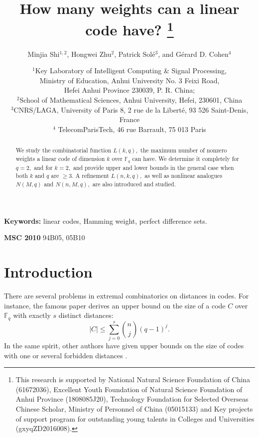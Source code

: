 \documentclass[12pt]{article}
\newcommand{\F}{\mathbb{F}}
\theoremstyle{definition}
\begin{document}
\title{\bf How many weights can a linear code have?
\thanks{This research is supported by National Natural Science Foundation of China (61672036), Excellent Youth Foundation of Natural Science Foundation of Anhui Province (1808085J20),
Technology Foundation for Selected Overseas Chinese Scholar, Ministry of Personnel of China (05015133) and
Key projects of support program for outstanding young talents in Colleges and Universities (gxyqZD2016008).}}

\author{
\small{Minjia Shi$^{1,2}$, Hongwei Zhu$^2$, Patrick Sol\'e$^3$, and G\'erard D. Cohen$^4$}\\ %
\and \small{${}^1$Key Laboratory of Intelligent Computing \& Signal Processing,}\\
 \small{Ministry of Education, Anhui University No. 3 Feixi Road,}\\
  \small{Hefei Anhui Province 230039, P. R. China;}\\
\small{${}^2$School of Mathematical Sciences, Anhui University, Hefei, 230601, China}\\
[-0.8ex]
\small{${}^3$CNRS/LAGA, University of Paris 8, 2 rue de la Libert\'e, 93 526 Saint-Denis, France}\\
\small{${}^4$ TelecomParisTech, 46 rue Barrault, 75 013 Paris}}
\date{}
\maketitle
\begin{abstract}  We study the combinatorial function $L(k,q),$ the maximum number of nonzero weights a linear code of dimension $k$ over $\F_q$ can have.
We determine it completely for $q=2,$ and for $k=2,$ and provide upper and lower bounds in the general case when both $k$ and $q$ are  $\ge 3.$
A refinement $L(n,k,q),$ as well as nonlinear analogues $N(M,q)$ and $N(n,M,q),$ are also introduced and studied.
\end{abstract}


{\bf Keywords:} linear codes, Hamming weight, perfect difference sets.

{\bf MSC 2010} 94B05, 05B10
\section{Introduction}
There are several problems in extremal combinatorics on distances in codes. For instance, the famous paper \cite{D} derives an upper bound on the size of a code $C$ over $\F_q$ with exactly $s$ distinct distances:
\begin{equation}
|C|\le \sum_{j=0}^s {n \choose j} (q-1)^j.
\end{equation}
In the same spirit, other authors have given upper bounds on the size of codes with one or several forbidden distances \cite{EFIN}.
\end{document}
